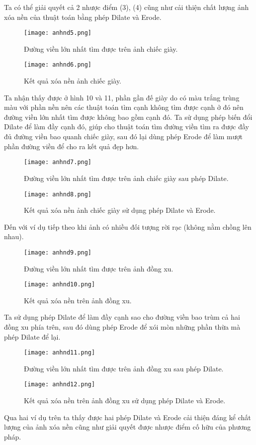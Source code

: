 \documentclass[conference]{IEEEtran}
\begin{document}
 Ta có thể giải quyết cả 2 nhược điểm (3), (4) cũng như cải thiện chất lượng ảnh xóa nền của thuật toán bằng phép Dilate và Erode.
  \begin{figure}[!htb]
\centerline{\texttt{[image: anhnd5.png]}}
\caption{Đường viền lớn nhất tìm được trên ảnh chiếc giày.}
\label{fig}
\end{figure}
 \FloatBarrier
   \begin{figure}[!htb]
\centerline{\texttt{[image: anhnd6.png]}}
\caption{Kết quả xóa nền ảnh chiếc giày.}
\label{fig}
\end{figure}
 \FloatBarrier
Ta nhận thấy được ở hình 10 và 11, phần gần đế giày do có màu trắng trùng màu với phần nền nên các thuật toán tìm cạnh không tìm được cạnh ở đó nên đường viền lớn nhất tìm được không bao gồm cạnh đó. Ta sử dụng phép biến đổi Dilate để làm đầy cạnh đó, giúp cho thuật toán tìm đường viền tìm ra được đầy đủ đường viền bao quanh chiếc giày, sau đó lại dùng phép Erode để làm mượt phần đường viền để cho ra kết quả đẹp hơn.

 \begin{figure}[!htb]
\centerline{\texttt{[image: anhnd7.png]}}
\caption{Đường viền lớn nhất tìm được trên ảnh chiếc giày sau phép Dilate.}
\label{fig}
\end{figure}
 \FloatBarrier
   \begin{figure}[!htb]
\centerline{\texttt{[image: anhnd8.png]}}
\caption{Kết quả xóa nền ảnh chiếc giày sử dụng phép Dilate và Erode.}
\label{fig}
\end{figure}
 \FloatBarrier
 Đến với ví dụ tiếp theo khi ảnh có nhiều đối tượng rời rạc (không nằm chồng lên nhau).
 \begin{figure}[!htb]
\centerline{\texttt{[image: anhnd9.png]}}
\caption{Đường viền lớn nhất tìm được trên ảnh đồng xu.}
\label{fig}
\end{figure}
 \FloatBarrier
  \begin{figure}[!htb]
\centerline{\texttt{[image: anhnd10.png]}}
\caption{Kết quả xóa nền trên ảnh đồng xu.}
\label{fig}
\end{figure}
 \FloatBarrier
 Ta sử dụng phép Dilate để làm đầy cạnh sao cho đường viền bao trùm cả hai đồng xu phía trên, sau đó dùng phép Erode để xói mòn những phần thừa mà phép Dilate để lại.
 \begin{figure}[!htb]
\centerline{\texttt{[image: anhnd11.png]}}
\caption{Đường viền lớn nhất tìm được trên ảnh đồng xu sau phép Dilate.}
\label{fig}
\end{figure}
 \FloatBarrier
  \begin{figure}[!htb]
\centerline{\texttt{[image: anhnd12.png]}}
\caption{Kết quả xóa nền trên ảnh đồng xu sử dụng phép Dilate và Erode.}
\label{fig}
\end{figure}
 \FloatBarrier
 Qua hai ví dụ trên ta thấy được hai phép Dilate và Erode cải thiện đáng kể chất lượng của ảnh xóa nền cũng như giải quyết được nhược điểm cố hữu của phương pháp.
\end{document}
